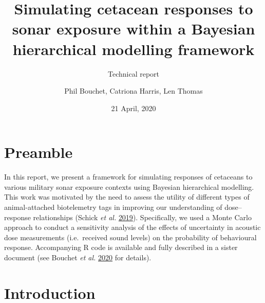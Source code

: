 \documentclass[
]{article}
\title{Simulating cetacean responses to sonar exposure within a Bayesian hierarchical modelling framework}
\subtitle{Technical report}
\author{Phil Bouchet, Catriona Harris, Len Thomas}
\date{21 April, 2020}
\begin{document}
\maketitle

{
\hypersetup{linkcolor=black}
\setcounter{tocdepth}{3}
\tableofcontents
}
\section{Preamble}

In this report, we present a framework for simulating responses of cetaceans to various military sonar exposure contexts using Bayesian hierarchical modelling. This work was motivated by the need to assess the utility of different types of animal-attached biotelemetry tags in improving our understanding of dose--response relationships (Schick \emph{et al.} \protect\hyperlink{ref-Schick2019}{2019}). Specifically, we used a Monte Carlo approach to conduct a sensitivity analysis of the effects of uncertainty in acoustic dose measurements (i.e.~received sound levels) on the probability of behavioural response. Accompanying R code is available and fully described in a sister document (see Bouchet \emph{et al.} \protect\hyperlink{ref-Bouchet2020b}{2020} for details).

\section{Introduction}
\end{document}
